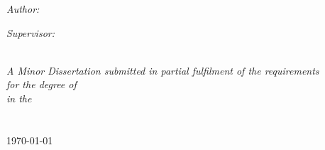 \documentclass[11pt, a4paper, oneside]{Thesis} %
\begin{document}
\begin{titlepage}
\begin{center}

\textsc{\LARGE \univname}\\[1.5cm] %
\textsc{\Large \ttitle}\\[0.5cm] %

\HRule \\[0.4cm] %
{\huge \bfseries \ttitle}\\[0.4cm] %
\HRule \\[1.5cm] %
 
\begin{minipage}{0.4\textwidth}
\begin{flushleft} \large
\emph{Author:}\\
\href{http://www.johnsmith.com}{\authornames} %
\end{flushleft}
\end{minipage}
\begin{minipage}{0.4\textwidth}
\begin{flushright} \large
\emph{Supervisor:} \\
\href{http://www.jamessmith.com}{\supname} %
\end{flushright}
\end{minipage}\\[3cm]
 
\large \textit{A Minor Dissertation submitted in partial fulfilment of the requirements\\ for the degree of \degreename}\\[0.3cm] %
\textit{in the}\\[0.4cm]
\groupname\\\deptname\\[2cm] %
 
{\large \today}\\[4cm] %
 
\vfill
\end{center}

\end{titlepage}

\end{document}
